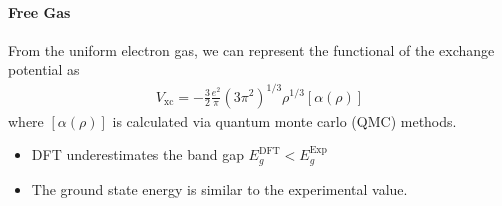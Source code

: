 \documentclass[../main.tex]{subfiles}
\begin{document}
\paragraph*{Free Gas}
From the uniform electron gas, we can represent the functional of the exchange potential as
\begin{align*}
    V_{\text{xc}} = -\frac{3}{2} \frac{e^2}{\pi} (3\pi^2)^{1/3} \rho^{1/3} [\alpha(\rho)]
\end{align*}
where $[\alpha(\rho)]$ is calculated via quantum monte carlo (QMC) methods. 
\begin{itemize}
    \item DFT underestimates the band gap $E_g^{\text{DFT}} < E_g^{\text{Exp}}$
    \item The ground state energy is similar to the experimental value.
\end{itemize}
\end{document}
